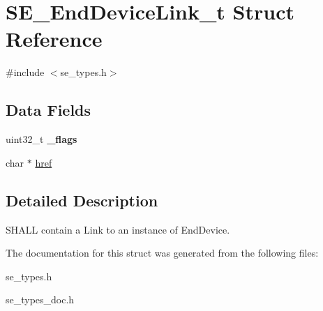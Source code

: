 \hypertarget{structSE__EndDeviceLink__t}{}\section{S\+E\+\_\+\+End\+Device\+Link\+\_\+t Struct Reference}
\label{structSE__EndDeviceLink__t}


{\ttfamily \#include $<$se\+\_\+types.\+h$>$}

\subsection*{Data Fields}
\begin{DoxyCompactItemize}
\item 
uint32\+\_\+t {\bfseries \+\_\+flags}
\item 
char $\ast$ \hyperlink{group__EndDeviceLink_gad00b1df34c0c7fdac7997e4da43de6e7}{href}
\end{DoxyCompactItemize}


\subsection{Detailed Description}
S\+H\+A\+LL contain a Link to an instance of End\+Device. 

The documentation for this struct was generated from the following files\+:\begin{DoxyCompactItemize}
\item 
se\+\_\+types.\+h\item 
se\+\_\+types\+\_\+doc.\+h\end{DoxyCompactItemize}
